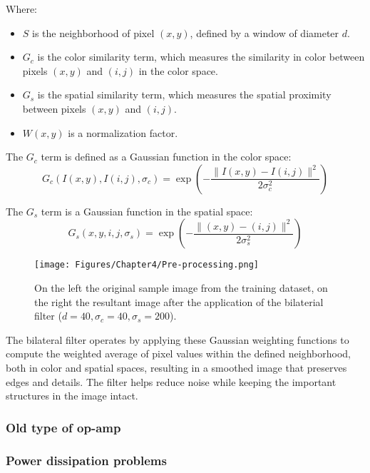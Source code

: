 Where:
\begin{itemize}
    \item \(S\) is the neighborhood of pixel \((x, y)\), defined by a window of diameter \(d\).
    \item \(G_c\) is the color similarity term, which measures the similarity in color between pixels \((x, y)\) and \((i, j)\) in the color space.
    \item \(G_s\) is the spatial similarity term, which measures the spatial proximity between pixels \((x, y)\) and \((i, j)\).
    \item \(W(x, y)\) is a normalization factor.
\end{itemize}
The \(G_c\) term is defined as a Gaussian function in the color space:
\begin{equation}
    G_c(I(x, y), I(i, j), \sigma_c) = \exp\left(-\frac{\|I(x, y) - I(i, j)\|^2}{2\sigma_c^2}\right)
\end{equation}

The \(G_s\) term is a Gaussian function in the spatial space:
\begin{equation}
    G_s(x, y, i, j, \sigma_s) = \exp\left(-\frac{\|(x, y) - (i, j)\|^2}{2\sigma_s^2}\right)
\end{equation}

\begin{figure}[th]
    \centering
    \texttt{[image: Figures/Chapter4/Pre-processing.png]}
    \caption[Input and pre-processed image.]{On the left the original sample image from the training dataset, on the right the resultant image after the application of the bilaterial filter ($d = 40,\sigma_c = 40,\sigma_s = 200$).}
    \label{fig:Pre-processing}
\end{figure}

The bilateral filter operates by applying these Gaussian weighting functions to compute the weighted average of pixel values within the defined neighborhood, both in color and spatial spaces, resulting in a smoothed image that preserves edges and details. The filter helps reduce noise while keeping the important structures in the image intact.

\subsubsection{Old type of op-amp}
\subsubsection{Power dissipation problems}

